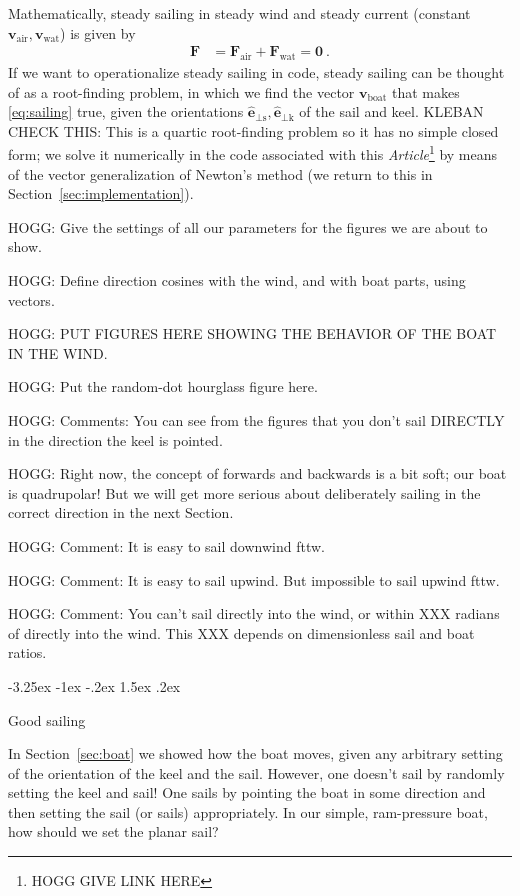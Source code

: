 \documentclass{article}
\makeatletter
\renewcommand{\vec}[1]{\boldsymbol{#1}}
\newcommand{\uvec}{\vec{\hat{e}}}
\newcommand{\air}{\text{air}}
\newcommand{\water}{\text{wat}}
\newcommand{\boat}{\text{boat}}
\newcommand{\sail}{\text{s}}
\newcommand{\keel}{\text{k}}
\newcommand{\vair}{\vec{v}_\air}
\newcommand{\vwater}{\vec{v}_\water}
\newcommand{\vboat}{\vec{v}_\boat}
\newcommand{\documentname}{\textsl{Article}}
\newcommand{\secref}[1]{Section~\ref{#1}}
\renewcommand\section{\@startsection {section}{1}{\z@}%
  {-3.25ex \@plus -1ex \@minus -.2ex}%
  {1.5ex \@plus .2ex}%
  {\raggedright\normalfont\large\bfseries}}
\makeatother
\begin{document}
Mathematically, steady sailing in steady wind and steady current (constant $\vair, \vwater$) is given by
\begin{align}\label{eq:sailing}
    \vec{F} &= \vec{F}_\air + \vec{F}_\water = \vec{0} ~.
\end{align}
If we want to operationalize steady sailing in code, steady sailing can be thought of as a root-finding problem, in which we find the vector $\vboat$ that makes \eqref{eq:sailing} true, given the orientations $\uvec_{\perp\sail}, \uvec_{\perp\keel}$ of the sail and keel. KLEBAN CHECK THIS: This is a quartic root-finding problem so it has no simple closed form; we solve it numerically in the code associated with this \documentname\footnote{HOGG GIVE LINK HERE} by means of the vector generalization of Newton's method (we return to this in \secref{sec:implementation}).

HOGG: Give the settings of all our parameters for the figures we are about to show.

HOGG: Define direction cosines with the wind, and with boat parts, using vectors.

HOGG: PUT FIGURES HERE SHOWING THE BEHAVIOR OF THE BOAT IN THE WIND.

HOGG: Put the random-dot hourglass figure here.

HOGG: Comments: You can see from the figures that you don't sail DIRECTLY in the direction the keel is pointed.

HOGG: Right now, the concept of forwards and backwards is a bit soft; our boat is quadrupolar! But we will get more serious about deliberately sailing in the correct direction in the next Section.

HOGG: Comment: It is easy to sail downwind fttw.

HOGG: Comment: It is easy to sail upwind. But impossible to sail upwind fttw.

HOGG: Comment: You can't sail directly into the wind, or within XXX radians of directly into the wind. This XXX depends on dimensionless sail and boat ratios.

\section{Good sailing}\label{sec:sailing}

In \secref{sec:boat} we showed how the boat moves, given any arbitrary setting of the orientation of the keel and the sail.
However, one doesn't sail by randomly setting the keel and sail!
One sails by pointing the boat in some direction and then setting the sail (or sails) appropriately.
In our simple, ram-pressure boat, how should we set the planar sail?
\end{document}
